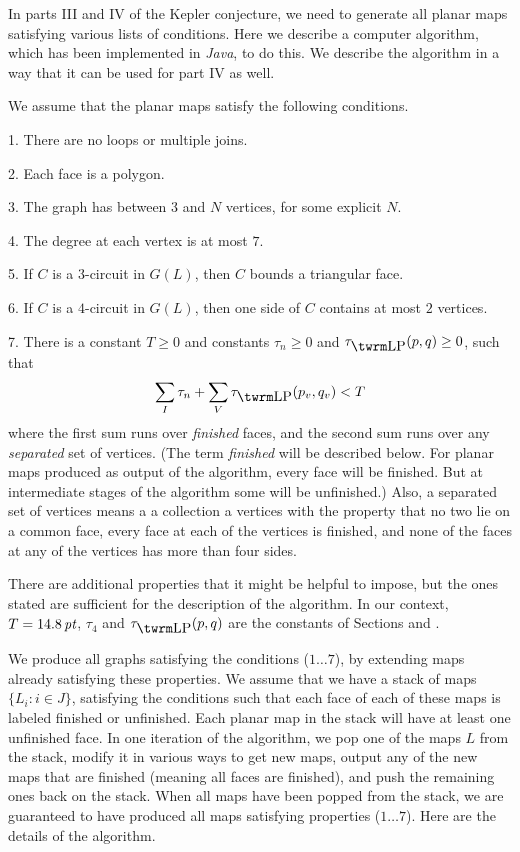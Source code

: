 In parts III and IV of the Kepler conjecture, we need to generate
all planar maps satisfying various lists of conditions.
Here we describe a computer algorithm, which has been implemented
in {\it Java}, to do this.  We describe the algorithm in a way
that it can be used for part IV as well.

We assume that the planar maps satisfy the following conditions.

1.  There are no loops or multiple joins.

2.  Each face is a polygon.

3.  The graph has between 3 and $N$ vertices, for some explicit $N$.

4.  The degree at each vertex is at most $7$.

5.  If $C$ is a $3$-circuit in $G(L)$, then $C$ bounds a triangular face.

6.  If $C$ is a $4$-circuit in $G(L)$, then one side of $C$ contains
	at most $2$ vertices.

7.  There is a constant $T\ge 0$ and constants $\tau_n\ge0$ and
$\tlp(p,q)\ge 0$, such that
	$$\sum_I\tau_n + \sum_V\tlp(p_v,q_v) < T$$
	where the first sum runs over {\it finished\/} faces, and
	the second sum runs over any {\it separated\/} set of vertices.
	(The term {\it finished\/}
	 will be described below.  For planar maps
	produced as output of the algorithm, every face will be finished.
	But at intermediate stages of the algorithm some will be unfinished.)
	Also, a separated set of vertices means a a collection a vertices
	with the property that no two lie on a common face, every face
	at each of the vertices is finished, and none of the faces at any
	of the vertices has more than four sides.

There are additional properties that it might be helpful to impose,
but the ones stated are sufficient for the description of the algorithm.
In our context, $T=14.8\,\hbox{\it pt}$, $\tau_4$ and $\tlp(p,q)$
are the constants of Sections  and .

We produce all graphs satisfying the conditions ($1\ldots 7$), 
by extending
maps already satisfying these properties.  We assume that we have
a stack of maps $\{ L_i : i\in J\}$, satisfying the conditions 
such 
that each face of each of these maps is labeled finished or unfinished.
Each planar map in the stack will have at least one unfinished face.
In one iteration of the algorithm, we pop one of the maps $L$ from the
stack, modify it in various ways to get new maps, output any of the
new maps that are finished (meaning all faces are finished), and push the
remaining ones back on the stack.  When all maps have been popped from
the stack, we are guaranteed to have produced all maps satisfying
properties ($1\ldots7$). Here are the details of the algorithm.

